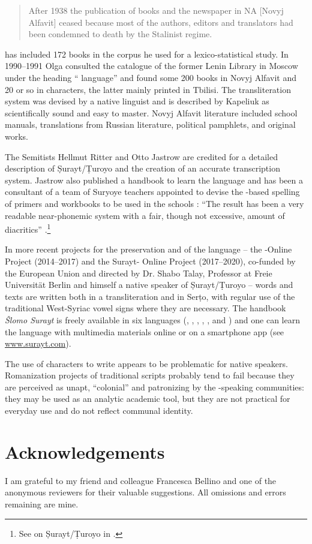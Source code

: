 \documentclass[output=paper,colorlinks,citecolor=brown,arabfont,syriacfont]{langscibook}
\begin{document}
\begin{quote}
After 1938 the publication of  books and the newspaper in NA [Novyj Alfavit] ceased because most of the authors, editors and translators had been condemned to death by the Stalinist regime. \citep[416]{lyavdansky2021}
\end{quote}

\citet{lyavdansky2021} has included 172 books in the corpus he used for a lexico-statistical study. In 1990--1991 Olga \citet[277]{kapeliuk1996} consulted the catalogue of the former Lenin Library in Moscow under the heading `` language'' and found some 200 books in Novyj Alfavit and 20 or so in  characters, the latter mainly printed in Tbilisi. The transliteration system was devised by a native linguist and is described by Kapeliuk as scientifically sound and easy to master. Novyj Alfavit literature included school manuals, translations from Russian literature, political pamphlets, and original works. 

The  Semitists Hellmut Ritter and Otto Jastrow are credited for a detailed description of Ṣurayt/Ṭuroyo and the creation of an accurate transcription system. Jastrow also published a handbook to learn the language and has been a consultant of a team of Suryoye teachers appointed to devise the -based spelling of primers and workbooks to be used in the  schools \citep{ishaq}: ``The result has been a very readable near-phonemic system with a fair, though not excessive, amount of diacritics'' \citep[183]{heinrichs1990}.\footnote{%
See \citet{tezel2021} on Ṣurayt/Ṭuroyo in .}

In more recent projects for the preservation and  of the  language -- the -Online Project (2014--2017) and the Surayt- Online Project (2017--2020), co-funded by the European Union and directed by Dr. Shabo Talay, Professor at Freie Universität Berlin and himself a native speaker of Ṣurayt/Ṭuroyo -- words and texts are written both in a  transliteration and in Serṭo, with regular use of the traditional West-Syriac  vowel signs where they are necessary. The handbook \textit{Šlomo Surayt} is freely available in six languages (, , , , , and ) and one can learn the language with multimedia materials online or on a smartphone app (see \url{www.surayt.com}).

The use of  characters to write  appears to be problematic for native speakers. Romanization projects of traditional scripts probably tend to fail because they are perceived as unapt, ``colonial'' and patronizing by the -speaking communities: they may be used as an analytic academic tool, but they are not practical for everyday use and do not reflect communal identity.

\section*{Acknowledgements}

I am grateful to my friend and colleague Francesca Bellino and one of the anonymous reviewers for their valuable suggestions. All omissions and errors remaining are mine.

\newpage
\sloppy
\printbibliography[heading=subbibliography,notkeyword=this]
\end{document}
